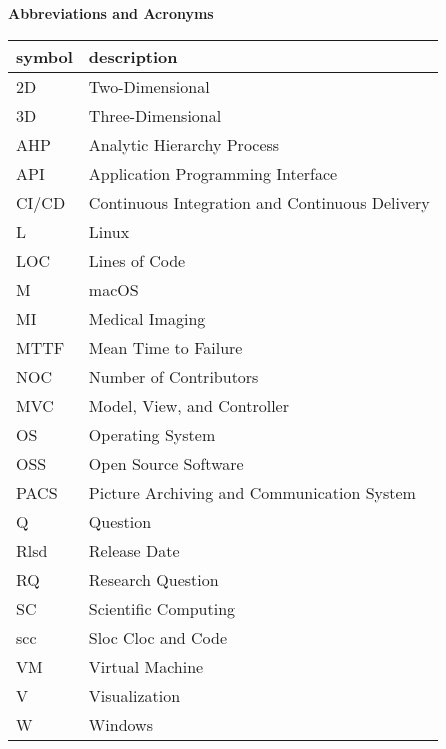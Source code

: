 \begin{center}
\textbf{\large Abbreviations and Acronyms}
\end{center}

\begin{table}[H]
\centering
\begin{tabular}{ll} 
\hline
\textbf{symbol} & \textbf{description}\\
\hline		
2D & Two-Dimensional\\
3D & Three-Dimensional\\
AHP & Analytic Hierarchy Process\\
API & Application Programming Interface\\
CI/CD & Continuous Integration and Continuous Delivery\\
L & Linux \\
LOC & Lines of Code\\
M & macOS\\
MI & Medical Imaging\\
MTTF & Mean Time to Failure\\
NOC &  Number of Contributors\\
MVC & Model, View, and Controller\\
OS & Operating System\\
OSS & Open Source Software\\
PACS & Picture Archiving and Communication System\\
Q & Question\\
Rlsd & Release Date\\
RQ & Research Question\\
SC & Scientific Computing\\
scc & Sloc Cloc and Code\\
VM & Virtual Machine\\
V & Visualization\\
W & Windows\\
\hline		
\end{tabular}\\
\end{table}
